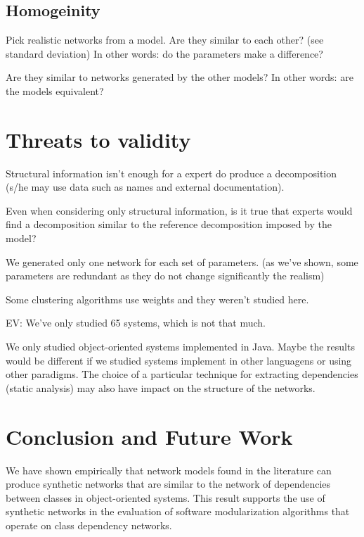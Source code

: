 \subsection{Homogeinity}

Pick realistic networks from a model. Are they similar to each other? (see
standard deviation) In other words: do the parameters make a difference?

Are they similar to networks generated by the other models? In other words: are
the models equivalent?

\section{Threats to validity}

Structural information isn't enough for a expert do produce a
decomposition (s/he may use data such as names and external documentation). 

Even when considering only structural information, is it true
that experts would find a decomposition similar to the reference decomposition
imposed by the model?

We generated only one network for each set of parameters. (as we've shown, some
parameters are redundant as they do not change significantly the realism)

Some clustering algorithms use weights and they weren't studied here.

EV: We've only studied 65 systems, which is not that much.

We only studied object-oriented systems implemented in Java. Maybe the results
would be different if we studied systems implement in other languagens or using
other paradigms. The choice of a particular technique for extracting
dependencies (static analysis) may also have impact on the structure of the
networks.


\section{Conclusion and Future Work}

We have shown empirically that network models found in the literature can
produce synthetic networks that are similar to the network of dependencies
between classes in object-oriented systems. This result supports the use of
synthetic networks in the evaluation of software modularization algorithms that
operate on class dependency networks. 

